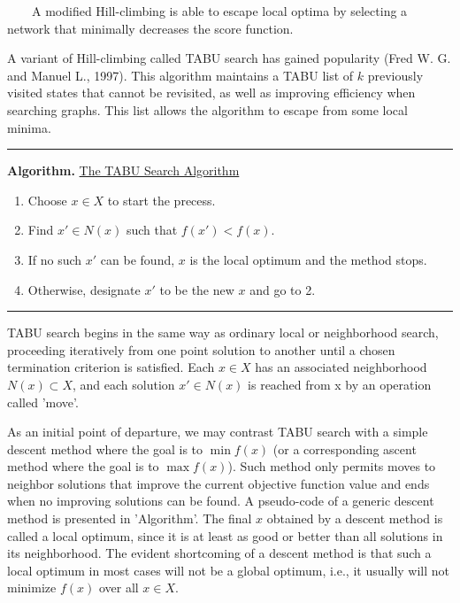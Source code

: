 ~~~~A modified Hill-climbing is able to escape local optima by selecting a network that minimally decreases the score function.

A variant of Hill-climbing called TABU search has gained popularity (Fred W. G. and Manuel L., 1997). This algorithm maintains a TABU list of $k$ previously visited states that cannot be revisited, as well as improving efficiency when searching graphs. This list allows the algorithm to escape from some local minima.

\begin{center}\rule[0.5ex]{0.9\columnwidth}{1pt}\end{center}

\textbf{Algorithm.} \underline{The TABU Search Algorithm}

\begin{enumerate}
	\item Choose $x \in X$ to start the precess.
	
	\item Find $x' \in N(x)$ such that $f(x') < f(x)$.
	
	\item If no such $x'$ can be found, $x$ is the local optimum and the method stops.
	
	\item Otherwise, designate $x'$ to be the new $x$ and go to 2.
\end{enumerate}

\begin{center}\rule[0.5ex]{0.9\columnwidth}{1pt}\end{center}

TABU search begins in the same way as ordinary local or neighborhood search, proceeding iteratively from one point solution to another until a chosen termination criterion is satisfied. Each $x \in X$ has an associated neighborhood $N(x) \subset X$, and each solution $x' \in N(x)$ is reached from x by an operation called 'move'.

As an initial point of departure, we may contrast TABU search with a simple descent method where the goal is to $\min f(x)$ (or a corresponding ascent method where the goal is to $\max f(x)$). Such method only permits moves to neighbor solutions that improve the current objective function value and ends when no improving solutions can be found. A pseudo-code of a generic descent method is presented in 'Algorithm'. The final $x$ obtained by a descent method is called a local optimum, since it is at least as good or better than all solutions in its neighborhood. The evident shortcoming of a descent method is that such a local optimum in most cases will not be a global optimum, i.e., it usually will not minimize $f(x)$ over all $x \in X$.